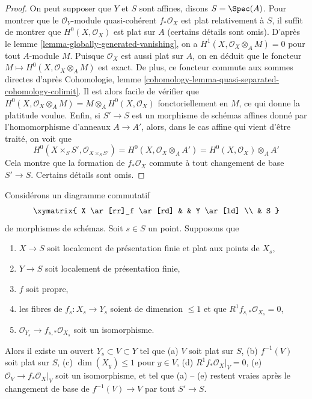 \begin{proof}
On peut supposer que $Y$ et $S$ sont affines, disons $S = \Spec(A)$.
Pour montrer que le $\mathcal{O}_Y$-module quasi-cohérent
$f_*\mathcal{O}_X$ est plat relativement à $S$, il suffit
de montrer que $H^0(X, \mathcal{O}_X)$ est plat sur $A$
(certains détails sont omis).
D'après le lemme \ref{lemma-globally-generated-vanishing}, on a
$H^1(X, \mathcal{O}_X \otimes_A M) = 0$ pour tout $A$-module $M$.
Puisque $\mathcal{O}_X$ est aussi plat sur $A$, on en déduit que le foncteur
$M \mapsto H^0(X, \mathcal{O}_X \otimes_A M)$ est exact.
De plus, ce foncteur commute aux sommes directes d'après
Cohomologie, lemme \ref{cohomology-lemma-quasi-separated-cohomology-colimit}.
Il est alors facile de vérifier que
$H^0(X, \mathcal{O}_X \otimes_A M) = M \otimes_A H^0(X, \mathcal{O}_X)$
fonctoriellement en $M$, ce qui donne la platitude voulue.
Enfin, si $S' \to S$ est un morphisme de schémas affines donné par
l'homomorphisme d'anneaux $A \to A'$, alors, dans le cas affine qui vient d'être traité,
on voit que
$$
H^0(X \times_S S', \mathcal{O}_{X \times_S S'}) =
H^0(X, \mathcal{O}_X \otimes_A A') = H^0(X, \mathcal{O}_X) \otimes_A A'
$$
Cela montre que la formation de $f_*\mathcal{O}_X$ commute
à tout changement de base $S' \to S$. Certains détails sont omis.
\end{proof}

\begin{lemma}
\label{lemma-h1-fibre-zero-isom}
Considérons un diagramme commutatif
$$
\xymatrix{
X \ar[rr]_f \ar[rd] & & Y \ar[ld] \\
& S
}
$$
de morphismes de schémas. Soit $s \in S$ un point. Supposons que
\begin{enumerate}
\item $X \to S$ soit localement de présentation finie et plat aux
points de $X_s$,
\item $Y \to S$ soit localement de présentation finie,
\item $f$ soit propre,
\item les fibres de $f_s : X_s \to Y_s$ soient de dimension $\leq 1$
et que $R^1f_{s, *}\mathcal{O}_{X_s} = 0$,
\item $\mathcal{O}_{Y_s} \to f_{s, *}\mathcal{O}_{X_s}$ soit un isomorphisme.
\end{enumerate}
Alors il existe un ouvert $Y_s \subset V \subset Y$ tel que
(a) $V$ soit plat sur $S$,
(b) $f^{-1}(V)$ soit plat sur $S$,
(c) $\dim(X_y) \leq 1$ pour $y \in V$,
(d) $R^1f_*\mathcal{O}_X|_V = 0$,
(e) $\mathcal{O}_V \to f_*\mathcal{O}_X|_V$
soit un isomorphisme, et tel que (a) -- (e)
restent vraies après le changement de base de $f^{-1}(V) \to V$ par tout $S' \to S$.
\end{lemma}

